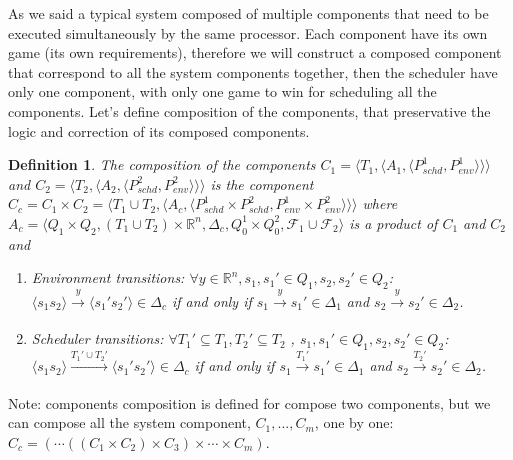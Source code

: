 \documentclass[ twoside, 12pt ]{article}
\newcommand\R{{\mathbb R}}
\newtheorem{dfn}{Definition} %
\begin{document}
As we said a typical system composed of multiple components that need to be executed simultaneously by the same processor.
Each component have its own game (its own requirements), therefore we will construct a composed component that correspond to all the system components together, then the scheduler have only one component, with only one game to win for scheduling all the components.
Let's define composition of the components, that preservative the logic and correction of its composed components.

\begin{dfn}
    The composition of the components $C_1=\langle T_1, \langle A_1, \langle P_{schd}^1, P_{env}^1\rangle\rangle\rangle$ and $C_2=\langle T_2, \langle A_2, \langle P_{schd}^2, P_{env}^2\rangle\rangle\rangle$ is the component $C_c = C_1 \times C_2 = \langle T_1 \cup T_2, \langle A_c, \langle P_{schd}^1 \times P_{schd}^2, P_{env}^1 \times P_{env}^2 \rangle\rangle\rangle$ where $A_c= \langle Q_1 \times Q_2,(T_1 \cup T_2) \times \R^n,\Delta_c,Q_0^1 \times Q_0^2,\mathcal{F}_1 \cup \mathcal{F}_2 \rangle$ is a product of $C_1$ and $C_2$ and 
    \begin{enumerate}
        \item Environment transitions: $\forall y \in \R^n, s_1 , s_1' \in Q_1, s_2 , s_2' \in Q_2$:
        $\langle s_{1} s_2 \rangle \xrightarrow[]{y} \langle s_{1}' s_2' \rangle \in \Delta_c$
        if and only if 
        $s_{1} \xrightarrow[]{y} s_{1}' \in \Delta_1$ and $s_{2} \xrightarrow[]{y} s_{2}' \in \Delta_2$.
        \item Scheduler transitions: $\forall T_1' \subseteq T_1,T_2' \subseteq T_2$ , $s_1 , s_1' \in Q_1, s_2 , s_2' \in Q_2$:
        $\langle s_{1} s_2 \rangle \xrightarrow[]{T_1' \cup T_2'} \langle s_{1}' s_2' \rangle \in \Delta_c$
        if and only if         
        $s_{1} \xrightarrow[]{T_1'} s_{1}' \in \Delta_1$ and $s_{2} \xrightarrow[]{T_2'} s_{2}' \in \Delta_2$.
    \end{enumerate}
\end{dfn}

Note: components composition is defined for compose two components, but we can compose all the system component, $C_1 , ... , C_m$, one by one: $C_c = (\cdots((C_1 \times C_2) \times C_3 ) \times \cdots \times C_m)$.
\end{document}
